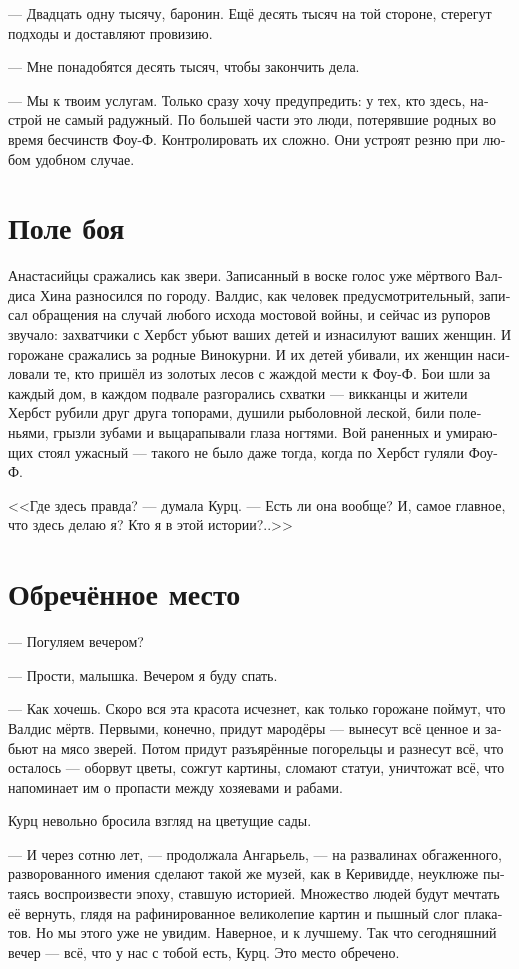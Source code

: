 \documentclass[a4paper,12pt,fleqn]{book}\usepackage{cooltooltips}\usepackage{polyglossia}\setdefaultlanguage[babelshorthands=true]{russian}\setotherlanguage{english}\defaultfontfeatures{Ligatures=TeX,Mapping=tex-text} \usepackage{xcolor}\definecolor{lightgray}{HTML}{bbbbbb}\color{lightgray}\newcommand{\ml}[3]{\textenglish{\textcolor{black}{#3}}}
\begin{document}
--- Двадцать одну тысячу, баронин.
Ещё десять тысяч на той стороне, стерегут подходы и доставляют провизию.

--- Мне понадобятся десять тысяч, чтобы закончить дела.

--- Мы к твоим услугам.
Только сразу хочу предупредить: у тех, кто здесь, настрой не самый радужный.
По большей части это люди, потерявшие родных во время бесчинств Фоу-Ф.
Контролировать их сложно.
Они устроят резню при любом удобном случае.

\section{Поле боя}

Анастасийцы сражались как звери.
Записанный в воске голос уже мёртвого Валдиса Хина разносился по городу.
Валдис, как человек предусмотрительный, записал обращения на случай любого исхода мостовой войны, и сейчас из рупоров звучало: захватчики с Хербст убьют ваших детей и изнасилуют ваших женщин.
И горожане сражались за родные Винокурни.
И их детей убивали, их женщин насиловали те, кто пришёл из золотых лесов с жаждой мести к Фоу-Ф.
Бои шли за каждый дом, в каждом подвале разгорались схватки --- викканцы и жители Хербст рубили друг друга топорами, душили рыболовной леской, били поленьями, грызли зубами и выцарапывали глаза ногтями.
Вой раненных и умирающих стоял ужасный --- такого не было даже тогда, когда по Хербст гуляли Фоу-Ф.

<<Где здесь правда? --- думала Курц.
--- Есть ли она вообще?
И, самое главное, что здесь делаю я?
Кто я в этой истории?..>>

\section{Обречённое место}

--- Погуляем вечером?

--- Прости, малышка.
Вечером я буду спать.

--- Как хочешь.
Скоро вся эта красота исчезнет, как только горожане поймут, что Валдис мёртв.
Первыми, конечно, придут мародёры --- вынесут всё ценное и забьют на мясо зверей.
Потом придут разъярённые погорельцы и разнесут всё, что осталось --- оборвут цветы, сожгут картины, сломают статуи, уничтожат всё, что напоминает им о пропасти между хозяевами и рабами.

Курц невольно бросила взгляд на цветущие сады.

--- И через сотню лет, --- продолжала Ангарьель, --- на развалинах обгаженного, разворованного имения сделают такой же музей, как в Керивидде, неуклюже пытаясь воспроизвести эпоху, ставшую историей.
Множество людей будут мечтать её вернуть, глядя на рафинированное великолепие картин и пышный слог плакатов.
Но мы этого уже не увидим.
Наверное, и к лучшему.
Так что сегодняшний вечер --- всё, что у нас с тобой есть, Курц.
Это место обречено.
\end{document}

